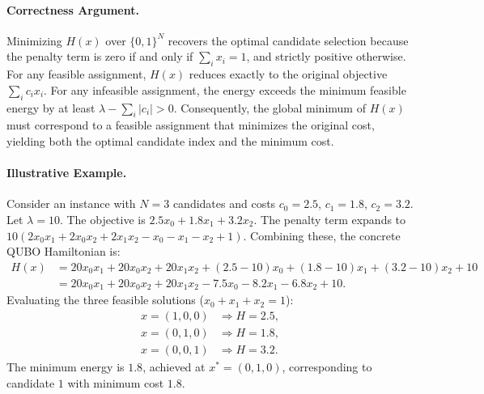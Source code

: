 \documentclass[12pt]{article}
\begin{document}
\paragraph{Correctness Argument.}
Minimizing $H(x)$ over $\{0,1\}^N$ recovers the optimal candidate selection because the penalty term is zero if and only if $\sum_i x_i = 1$, and strictly positive otherwise. For any feasible assignment, $H(x)$ reduces exactly to the original objective $\sum_i c_i x_i$. For any infeasible assignment, the energy exceeds the minimum feasible energy by at least $\lambda - \sum_i |c_i| > 0$. Consequently, the global minimum of $H(x)$ must correspond to a feasible assignment that minimizes the original cost, yielding both the optimal candidate index and the minimum cost.

\paragraph{Illustrative Example.}
Consider an instance with $N=3$ candidates and costs $c_0 = 2.5$, $c_1 = 1.8$, $c_2 = 3.2$. Let $\lambda = 10$. The objective is $2.5 x_0 + 1.8 x_1 + 3.2 x_2$. The penalty term expands to $10(2 x_0 x_1 + 2 x_0 x_2 + 2 x_1 x_2 - x_0 - x_1 - x_2 + 1)$. Combining these, the concrete QUBO Hamiltonian is:
\begin{align}
H(x) &= 20 x_0 x_1 + 20 x_0 x_2 + 20 x_1 x_2 + (2.5 - 10) x_0 + (1.8 - 10) x_1 + (3.2 - 10) x_2 + 10 \\
&= 20 x_0 x_1 + 20 x_0 x_2 + 20 x_1 x_2 - 7.5 x_0 - 8.2 x_1 - 6.8 x_2 + 10.
\end{align}
Evaluating the three feasible solutions ($x_0+x_1+x_2=1$):
\begin{align}
x = (1,0,0) &\Rightarrow H = 2.5, \\
x = (0,1,0) &\Rightarrow H = 1.8, \\
x = (0,0,1) &\Rightarrow H = 3.2.
\end{align}
The minimum energy is $1.8$, achieved at $x^* = (0,1,0)$, corresponding to candidate $1$ with minimum cost $1.8$.
\end{document}

